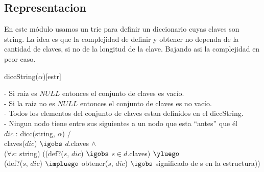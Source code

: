 \begin{Representacion}
\subsection{Representacion}

  
	En este m\'odulo usamos un trie para definir un diccionario cuyas claves son string.
$ $\newline La idea es que la complejidad de definir y obtener no dependa de la cantidad de claves, si no de la longitud de la clave. Bajando asi la complejidad en peor caso.  
  
  \begin{Estructura}{diccString($\alpha$)}[estr]
    \begin{Tupla}[estr]
    \end{Tupla}

    \begin{Tupla}[nodo]
    \end{Tupla}
  \end{Estructura}



- Si raiz es $NULL$ entonces el conjunto de claves es vac\'io. \\
- Si la raiz no es $NULL$ entonces el conjunto de claves es no vac\'io. \\
- Todos los elementos del conjunto de claves estan definidos en el diccString. \\
- Ningun nodo tiene entre sus siguientes a un nodo que esta ``antes'' que \'el \\ 

%
{
$dic$ : dicc(string, $\alpha$) / \\
	claves($dic$) $\igobs$ $d$.claves $\land$ \\
	
	($\forall s$: string) 
		((def?($s$, $dic$) $\igobs$ $s \in d$.claves)  $\yluego$ \\
		(def?($s$, $dic$) $\impluego$ obtener($s$, $dic$) $\igobs$ significado de s en la estructura))   
}%

\end{Representacion}

